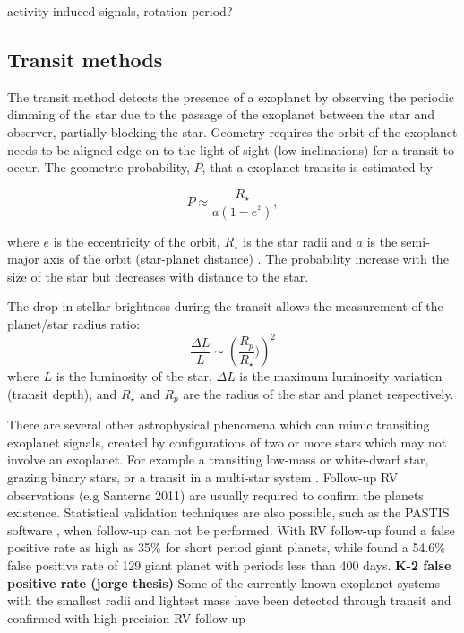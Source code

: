 activity induced signals, rotation period?

\subsection{Transit methods}
The transit method detects the presence of a exoplanet by observing the periodic dimming of the star due to the passage of the exoplanet between the star and observer, partially blocking the star.
Geometry requires the orbit of the exoplanet needs to be aligned edge-on to the light of sight (low inclinations) for a transit to occur.
The geometric probability, $P$, that a exoplanet transits is estimated by 

\begin{equation}
P \approx \frac{R_{\star}}{a(1-e^^2)},
\end{equation}

where \(e\) is the eccentricity of the orbit, $R_{\star}$ is the star radii and \(a\) is the semi-major axis of the orbit (star-planet distance) \citep{barnes_effects_2007}.
The probability increase with the size of the star but decreases with distance to the star.

The drop in stellar brightness during the transit allows the measurement of the planet/star radius ratio:
\begin{equation}
    \frac{\Delta L}{L} \sim \left(\frac{R_p}{R_{\star}})\right)^2
\end{equation}
where \(L\) is the luminosity of the star, \(\Delta L\) is the maximum luminosity variation (transit depth), and \(R_{\star}\) and \(R_p\) are the radius of the star and planet respectively.


There are several other astrophysical phenomena which can mimic transiting exoplanet signals, created by configurations of two or more stars which may not involve an exoplanet. 
For example a transiting low-mass or white-dwarf star, grazing binary stars, or a transit in a multi-star system \citep[e.g.][]{Cameron 2012, Santerne 2013}.
Follow-up RV observations (e.g Santerne 2011) are usually required to confirm the planets existence. 
Statistical validation techniques are also possible, such as the PASTIS software \cite{diaz_pastis_2014}, when follow-up can not be performed.
With RV follow-up \citet{santerne_sophie_2012} found a false positive rate as high as 35\% for short period giant planets, while \citet{santerne_2016} found a 54.6\% false positive rate of 129 giant planet with periods less than 400 days. \textbf{K-2 false positive rate (jorge thesis)}
Some of the currently known exoplanet systems with the smallest radii and lightest mass have been detected through transit and confirmed with high-precision RV follow-up \citep[e.g.][]{queloz_corot7_2009, pepe_earthsized_2013, lopez-morales_kepler21b_2016, ment_second_2018}

